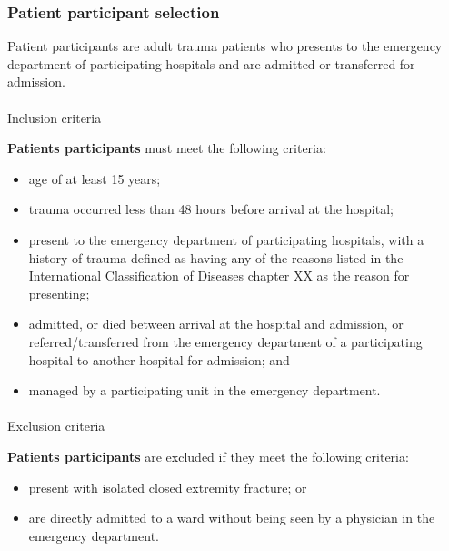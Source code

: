 \documentclass[
]{scrartcl}
\makeatletter
\let\oldparagraph\paragraph
\renewcommand{\paragraph}{
    \@ifstar
      \xxxParagraphStar
      \xxxParagraphNoStar
  }
\newcommand{\xxxParagraphStar}[1]{\oldparagraph*{#1}\mbox{}}
\newcommand{\xxxParagraphNoStar}[1]{\oldparagraph{#1}\mbox{}}
\providecommand{\tightlist}{%
  \setlength{\itemsep}{0pt}\setlength{\parskip}{0pt}}\usepackage{longtable,booktabs,array}
\makeatother
\begin{document}
\subsubsection{Patient participant
selection}\label{patient-participant-selection}

Patient participants are adult trauma patients who presents to the
emergency department of participating hospitals and are admitted or
transferred for admission.

\paragraph{Inclusion criteria}\label{inclusion-criteria-1}

\textbf{Patients participants} must meet the following criteria:

\begin{itemize}
\tightlist
\item
  age of at least 15 years;
\item
  trauma occurred less than 48 hours before arrival at the hospital;
\item
  present to the emergency department of participating hospitals, with a
  history of trauma defined as having any of the reasons listed in the
  International Classification of Diseases chapter XX as the reason for
  presenting;
\item
  admitted, or died between arrival at the hospital and admission, or
  referred/transferred from the emergency department of a participating
  hospital to another hospital for admission; and
\item
  managed by a participating unit in the emergency department.
\end{itemize}

\paragraph{Exclusion criteria}\label{exclusion-criteria-1}

\textbf{Patients participants} are excluded if they meet the following
criteria:

\begin{itemize}
\tightlist
\item
  present with isolated closed extremity fracture; or
\item
  are directly admitted to a ward without being seen by a physician in
  the emergency department.
\end{itemize}
\end{document}
